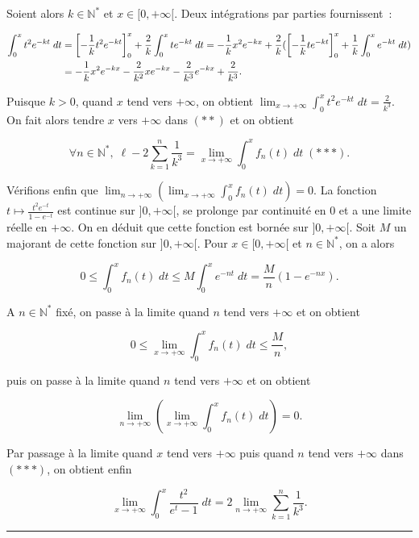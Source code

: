 \documentclass[11pt,a4paper]{article}
\newcommand{\Nn}{\mathbb{N}} \newcommand{\N}{\mathbb{N}}
\newcommand{\fincorrection}{\vspace{1mm}\hrule\vspace*{7mm}}
\begin{document}
\begin{enumerate}
Soient alors $k\in\Nn^*$ et $x\in[0,+\infty[$. Deux intégrations par parties fournissent~:

\begin{align*}\ensuremath
\int_{0}^{x}t^2e^{-kt}\;dt&=\left[-\frac{1}{k}t^2e^{-kt}\right]_{0}^{x}+\frac{2}{k}\int_{0}^{x}te^{-kt}\;dt
=-\frac{1}{k}x^2e^{-kx}+\frac{2}{k}(\left[-\frac{1}{k}te^{-kt}\right]_{0}^{x}+\frac{1}{k}\int_{0}^{x}e^{-kt}\;dt)\\
 &=-\frac{1}{k}x^2e^{-kx}-\frac{2}{k^2}xe^{-kx}-\frac{2}{k^3}e^{-kx}+\frac{2}{k^3}.
\end{align*}

Puisque $k>0$, quand $x$ tend vers $+\infty$, on obtient $\lim_{x\rightarrow +\infty}\int_{0}^{x}t^2e^{-kt}\;dt=\frac{2}{k^3}$. On fait alors tendre $x$ vers $+\infty$ dans $(**)$ et on obtient

$$\forall n\in\Nn^*,\;\ell-2\sum_{k=1}^{n}\frac{1}{k^3}=\lim_{x\rightarrow +\infty}\int_{0}^{x}f_n(t)\;dt\;(***).$$

Vérifions enfin que $\lim_{n\rightarrow +\infty}\left(\lim_{x\rightarrow +\infty}\int_{0}^{x}f_n(t)\;dt\right)=0$. La fonction $t\mapsto\frac{t^2e^{-t}}{1-e^{-t}}$ est continue sur $]0,+\infty[$, se prolonge par continuité en $0$ et a une limite réelle en $+\infty$. On en déduit que cette fonction est bornée sur $]0,+\infty[$. Soit $M$ un majorant de cette fonction sur $]0,+\infty[$. Pour $x\in[0,+\infty[$ et $n\in\Nn^*$, on a alors

$$0\leq\int_{0}^{x}f_n(t)\;dt\leq M\int_{0}^{x}e^{-nt}\;dt=\frac{M}{n}(1-e^{-nx}).$$

A $n\in\Nn^*$ fixé, on passe à la limite quand $n$ tend vers $+\infty$ et on obtient

$$0\leq\lim_{x\rightarrow +\infty}\int_{0}^{x}f_n(t)\;dt\leq\frac{M}{n},$$

puis on passe à la limite quand $n$ tend vers $+\infty$ et on obtient

$$\lim_{n\rightarrow +\infty}\left(\lim_{x\rightarrow +\infty}\int_{0}^{x}f_n(t)\;dt\right)=0.$$

Par passage à la limite quand $x$ tend vers $+\infty$ puis quand $n$ tend vers $+\infty$ dans $(***)$, on obtient enfin

$$\lim_{x\rightarrow +\infty}\int_{0}^{x}\frac{t^2}{e^t-1}\;dt=2\lim_{n\rightarrow +\infty}\sum_{k=1}^{n}\frac{1}{k^3}.$$
 
\end{enumerate}
\fincorrection
\end{document}
